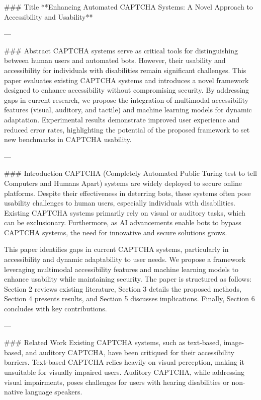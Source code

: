 ### Title
**Enhancing Automated CAPTCHA Systems: A Novel Approach to Accessibility and Usability**

---

### Abstract
CAPTCHA systems serve as critical tools for distinguishing between human users and automated bots. However, their usability and accessibility for individuals with disabilities remain significant challenges. This paper evaluates existing CAPTCHA systems and introduces a novel framework designed to enhance accessibility without compromising security. By addressing gaps in current research, we propose the integration of multimodal accessibility features (visual, auditory, and tactile) and machine learning models for dynamic adaptation. Experimental results demonstrate improved user experience and reduced error rates, highlighting the potential of the proposed framework to set new benchmarks in CAPTCHA usability.

---

### Introduction
CAPTCHA (Completely Automated Public Turing test to tell Computers and Humans Apart) systems are widely deployed to secure online platforms. Despite their effectiveness in deterring bots, these systems often pose usability challenges to human users, especially individuals with disabilities. Existing CAPTCHA systems primarily rely on visual or auditory tasks, which can be exclusionary. Furthermore, as AI advancements enable bots to bypass CAPTCHA systems, the need for innovative and secure solutions grows.

This paper identifies gaps in current CAPTCHA systems, particularly in accessibility and dynamic adaptability to user needs. We propose a framework leveraging multimodal accessibility features and machine learning models to enhance usability while maintaining security. The paper is structured as follows: Section 2 reviews existing literature, Section 3 details the proposed methods, Section 4 presents results, and Section 5 discusses implications. Finally, Section 6 concludes with key contributions.

---

### Related Work
Existing CAPTCHA systems, such as text-based, image-based, and auditory CAPTCHA, have been critiqued for their accessibility barriers. Text-based CAPTCHA relies heavily on visual perception, making it unsuitable for visually impaired users. Auditory CAPTCHA, while addressing visual impairments, poses challenges for users with hearing disabilities or non-native language speakers.

